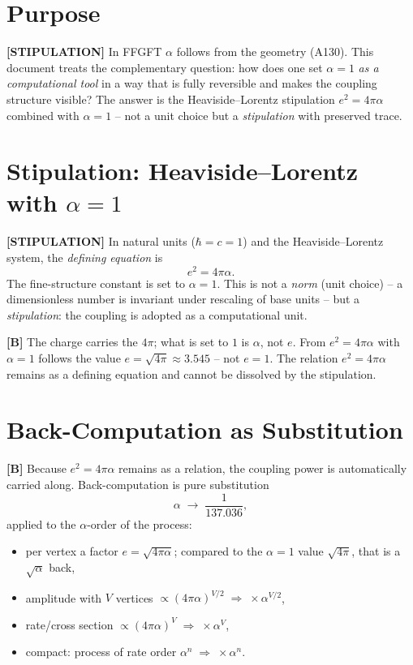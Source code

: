 \section{Purpose}

\textbf{[STIPULATION]} In FFGFT $\alpha$ follows from the geometry (A130). This
document treats the complementary question: how does one set $\alpha=1$ \emph{as
a computational tool} in a way that is fully reversible and makes the coupling
structure visible? The answer is the Heaviside--Lorentz stipulation $e^2=4\pi\alpha$
combined with $\alpha=1$ -- not a unit choice but a \emph{stipulation} with
preserved trace.

\section{Stipulation: Heaviside--Lorentz with $\alpha = 1$}

\textbf{[STIPULATION]} In natural units ($\hbar=c=1$) and the Heaviside--Lorentz
system, the \emph{defining equation} is
\[
  e^2 = 4\pi\alpha.
\]
The fine-structure constant is set to $\alpha=1$. This is not a \emph{norm} (unit
choice) -- a dimensionless number is invariant under rescaling of base units --
but a \emph{stipulation}: the coupling is adopted as a computational unit.

\textbf{[B]} The charge carries the $4\pi$; what is set to $1$ is $\alpha$, not
$e$. From $e^2=4\pi\alpha$ with $\alpha=1$ follows the value
$e=\sqrt{4\pi}\approx3{.}545$ -- not $e=1$. The relation $e^2=4\pi\alpha$
remains as a defining equation and cannot be dissolved by the stipulation.

\section{Back-Computation as Substitution}

\textbf{[B]} Because $e^2=4\pi\alpha$ remains as a relation, the coupling power
is automatically carried along. Back-computation is pure substitution
\[
  \alpha \;\longrightarrow\; \frac{1}{137{.}036},
\]
applied to the $\alpha$-order of the process:
\begin{itemize}[leftmargin=2em,itemsep=2pt,topsep=2pt]
  \item per vertex a factor $e=\sqrt{4\pi\alpha}$; compared to the $\alpha{=}1$
    value $\sqrt{4\pi}$, that is a $\sqrt\alpha$ back,
  \item amplitude with $V$ vertices $\propto(4\pi\alpha)^{V/2}
    \;\Rightarrow\;\times\alpha^{V/2}$,
  \item rate/cross section $\propto(4\pi\alpha)^V
    \;\Rightarrow\;\times\alpha^V$,
  \item compact: process of rate order $\alpha^n
    \;\Rightarrow\;\times\alpha^n$.
\end{itemize}

